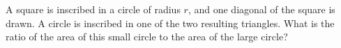 A square is inscribed in a circle of radius $r$, and one diagonal of the square is drawn. A circle is inscribed in one of the two resulting triangles. What is the ratio of the area of this small circle to the area of the large circle?
